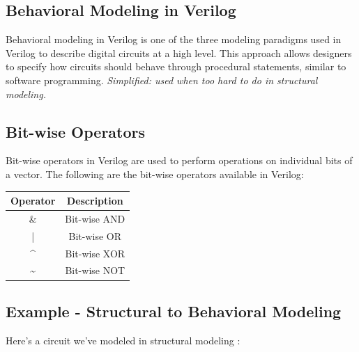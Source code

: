 \documentclass[12pt,openany]{book}
\begin{document}
\subsection{Behavioral Modeling in Verilog}

Behavioral modeling in Verilog is one of the three modeling paradigms used in Verilog to describe digital circuits at a high level. This approach allows designers to specify how circuits should behave through procedural statements, similar to software programming. 
\textit{Simplified: used when too hard to do in structural modeling.}  


\subsection{Bit-wise Operators}
Bit-wise operators in Verilog are used to perform operations on individual bits of a vector. The following are the bit-wise operators available in Verilog:
\begin{center}
	\begin{tabular}{|c|c|}
		\hline
		Operator & Description \\
		\hline
		\& & Bit-wise AND \\
		| & Bit-wise OR \\
		\^{} & Bit-wise XOR \\
		\~{} & Bit-wise NOT \\
		\hline
	\end{tabular}
\end{center}

\subsection{Example - Structural to Behavioral Modeling}
Here's a circuit we've modeled in structural modeling :
\end{document}

